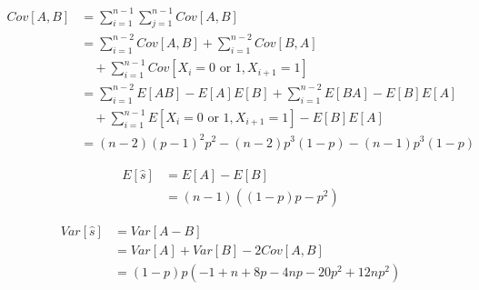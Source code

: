 \documentclass[12pt]{article}
\begin{document}
    \begin{equation*}
        \begin{split}
        Cov[A,B]& =\sum_{i=1}^{n-1}\sum_{j=1}^{n-1}Cov[A,B] \\
                & =\sum_{i=1}^{n-2}Cov[A,B]+\sum_{i=1}^{n-2}Cov[B,A] \\
                & \quad +\sum_{i=1}^{n-1}Cov[X_i=0\text{ or }1,X_{i+1}=1] \\
                & =\sum_{i=1}^{n-2}E[AB]-E[A]E[B]+\sum_{i=1}^{n-2}E[BA]-
                  E[B]E[A] \\
                & \quad +\sum_{i=1}^{n-1}E[X_i=0\text{ or }1,X_{i+1}=1]-
                  E[B]E[A] \\
                & =(n-2)(p-1)^2p^2-(n-2)p^3(1-p)-(n-1)p^3(1-p)
        \end{split}
    \end{equation*}

    \begin{equation*}
        \begin{split}
        E[\hat{s}]& =E[A]-E[B] \\
                  & =(n-1)\left((1-p)p-p^2\right)
        \end{split}
    \end{equation*}

    \begin{equation*}
        \begin{split}
        Var[\hat{s}]& =Var[A-B] \\
                    & =Var[A]+Var[B]-2Cov[A,B] \\
                    & =(1-p)p(-1+n+8p-4np-20p^2+12np^2)
        \end{split}
    \end{equation*}
\end{document}
